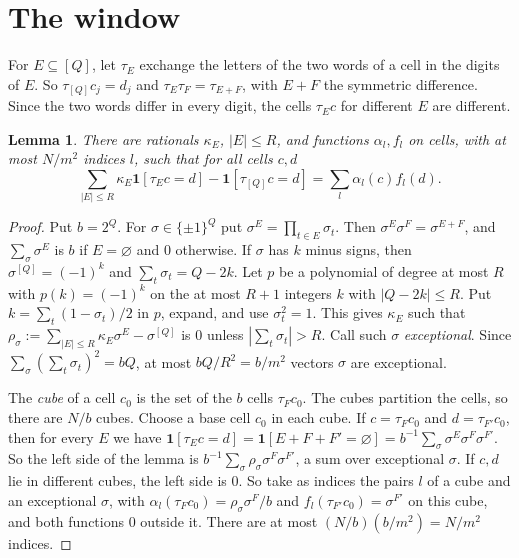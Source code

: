 \documentclass[11pt]{article}
\numberwithin{equation}{section}
\newtheorem{lemma}[theorem]{Lemma}
\theoremstyle{remark}
\begin{document}
\section{The window}\label{sec:window}

For $E\subseteq[Q]$, let $\tau_E$ exchange the letters of the two words of a cell in the digits of $E$. So $\tau_{[Q]}c_j=d_j$ and $\tau_E\tau_F=\tau_{E+F}$, with $E+F$ the symmetric difference. Since the two words differ in every digit, the cells $\tau_Ec$ for different $E$ are different.

\begin{lemma}\label{lem:window}
There are rationals $\kappa_E$, $|E|\le R$, and functions $\alpha_l,f_l$ on cells, with at most $N/m^2$ indices $l$, such that for all cells $c,d$
\[
\sum_{|E|\le R}\kappa_E\mathbf 1[\tau_Ec=d]-\mathbf 1[\tau_{[Q]}c=d]=\sum_l\alpha_l(c)f_l(d).
\]
\end{lemma}
\begin{proof}
Put $b=2^Q$. For $\sigma\in\{\pm1\}^Q$ put $\sigma^E=\prod_{t\in E}\sigma_t$. Then $\sigma^E\sigma^F=\sigma^{E+F}$, and $\sum_\sigma\sigma^E$ is $b$ if $E=\varnothing$ and $0$ otherwise. If $\sigma$ has $k$ minus signs, then $\sigma^{[Q]}=(-1)^k$ and $\sum_t\sigma_t=Q-2k$. Let $p$ be a polynomial of degree at most $R$ with $p(k)=(-1)^k$ on the at most $R+1$ integers $k$ with $|Q-2k|\le R$. Put $k=\sum_t(1-\sigma_t)/2$ in $p$, expand, and use $\sigma_t^2=1$. This gives $\kappa_E$ such that $\rho_\sigma:=\sum_{|E|\le R}\kappa_E\sigma^E-\sigma^{[Q]}$ is $0$ unless $|\sum_t\sigma_t|>R$. Call such $\sigma$ \emph{exceptional}. Since $\sum_\sigma(\sum_t\sigma_t)^2=bQ$, at most $bQ/R^2=b/m^2$ vectors $\sigma$ are exceptional.

The \emph{cube} of a cell $c_0$ is the set of the $b$ cells $\tau_Fc_0$. The cubes partition the cells, so there are $N/b$ cubes. Choose a base cell $c_0$ in each cube. If $c=\tau_Fc_0$ and $d=\tau_{F'}c_0$, then for every $E$ we have $\mathbf 1[\tau_Ec=d]=\mathbf 1[E+F+F'=\varnothing]=b^{-1}\sum_\sigma\sigma^E\sigma^F\sigma^{F'}$. So the left side of the lemma is $b^{-1}\sum_\sigma\rho_\sigma\sigma^F\sigma^{F'}$, a sum over exceptional $\sigma$. If $c,d$ lie in different cubes, the left side is $0$. So take as indices the pairs $l$ of a cube and an exceptional $\sigma$, with $\alpha_l(\tau_Fc_0)=\rho_\sigma\sigma^F/b$ and $f_l(\tau_{F'}c_0)=\sigma^{F'}$ on this cube, and both functions $0$ outside it. There are at most $(N/b)(b/m^2)=N/m^2$ indices.
\end{proof}
\end{document}
